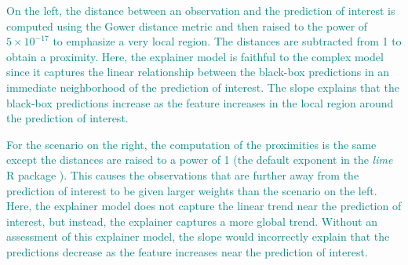 \documentclass[AMS,STIX2COL]{WileyNJD-v2}\usepackage[]{graphicx}\usepackage[]{color}
\newcommand{\kge}[1]{\textcolor{teal}{#1}}
\renewcommand{\sout}[1]{\unskip}
\begin{document}
\kge{On the left, the distance between an observation and the prediction of interest is computed using the Gower distance metric \citep{gower:1971} and then raised to the power of \ensuremath{5\times 10^{-17}} to emphasize a very local region. The distances are subtracted from 1 to obtain a proximity. Here, the explainer model is faithful to the complex model since it captures the linear relationship between the black-box predictions in an immediate neighborhood of the prediction of interest. The slope \sout{of 0.634} explains that the black-box predictions increase as the feature increases in the local region around the prediction of interest.}

\kge{For the scenario on the right, the computation of the proximities is the same except the distances are raised to a power of 1 (the default exponent in the \emph{lime} R package \citep{pedersen:2020}). This causes the observations that are further away from the prediction of interest to be given larger weights than the scenario on the left. Here, the explainer model does not capture the linear trend near the prediction of interest, but instead, the explainer captures a more global trend. Without an assessment of this explainer model, the slope \sout{of -0.181} would incorrectly explain that the predictions decrease as the feature increases near the prediction of interest.} %

\end{document}
